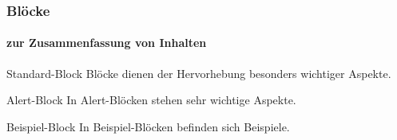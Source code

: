 \begin{frame}
    \frametitle{Bl\"ocke}
    \framesubtitle{zur Zusammenfassung von Inhalten}

    \begin{block}{Standard-Block}
        Bl\"ocke dienen der Hervorhebung besonders wichtiger Aspekte.
    \end{block}

    \begin{alertblock}{Alert-Block}
        In Alert-Bl\"ocken stehen sehr wichtige Aspekte.
    \end{alertblock}

    \begin{exampleblock}{Beispiel-Block}
        In Beispiel-Bl\"ocken befinden sich Beispiele.
    \end{exampleblock}
\end{frame}